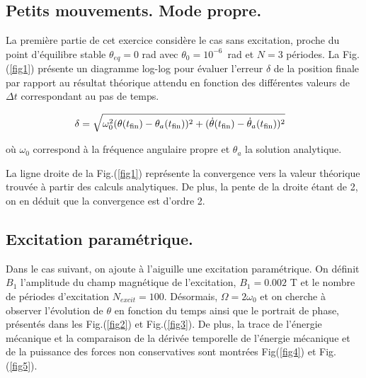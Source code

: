 \documentclass[a4paper,12pt,twoside]{article}
\begin{document}
\subsection{Petits mouvements. Mode propre.}

La première partie de cet exercice considère le cas sans excitation, proche du point d'équilibre stable $\theta_{eq} = 0$ rad avec $\theta_0=10^{-6}$\, rad et $N=3$ périodes. La Fig.(\ref{fig1}) présente un diagramme log-log pour évaluer l'erreur $\delta$ de la position finale par rapport au résultat théorique attendu en fonction des différentes valeurs de $\Delta t$ correspondant au  pas de temps.

\vspace{-0.5cm}
\[
\hspace{-0.3cm}
\delta = \\ \sqrt{\omega^2_0 (\theta(t_{\text{fin}}) - \theta_a(t_{\text{fin}}))^2 + (\dot{\theta}(t_{\text{fin}}) - \dot{\theta}_a(t_{\text{fin}}))^2} \\
\]

\noindent où $\omega_0$ correspond à la fréquence angulaire propre et $\theta_a$ la solution analytique.

\clearpage

La ligne droite de la Fig.(\ref{fig1}) représente la convergence vers la valeur théorique trouvée à partir des calculs analytiques. De plus, la pente de la droite étant de 2, on en déduit que la convergence est d'ordre 2.

\subsection{Excitation paramétrique.} \label{sec3.3}

Dans le cas suivant, on ajoute à l'aiguille une excitation paramétrique. On définit $B_1$ l'amplitude du champ magnétique de l'excitation, $ B_1=0.002$ T et le nombre de périodes d'excitation $N_{excit}=100$. Désormais, $\Omega = 2\omega_0$ et on cherche à observer l'évolution de $\theta$ en fonction du temps ainsi que le portrait de phase, présentés dans les Fig.(\ref{fig2}) et Fig.(\ref{fig3}). De plus, la trace de l'énergie mécanique et la comparaison de la dérivée temporelle de l'énergie mécanique et de la puissance des forces non conservatives sont montrées Fig(\ref{fig4}) et Fig.(\ref{fig5}).
\end{document}
